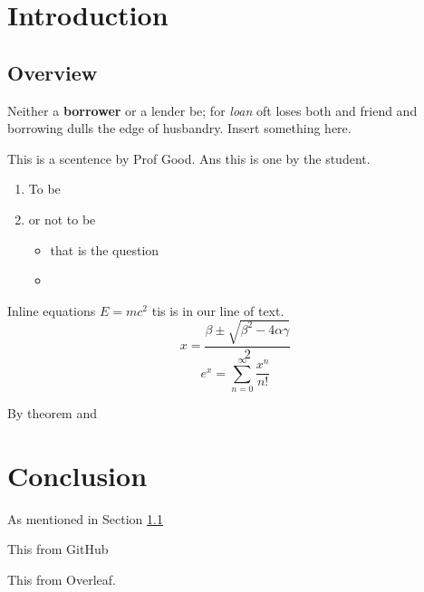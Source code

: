 \chapter{Introduction}

\section{Overview}
\label{Sec:Overview}

Neither a \textbf{borrower} or a lender be; for \textit{loan} oft loses both  and friend and borrowing dulls the edge of husbandry. Insert something here.

This is a scentence by Prof Good. Ans this is one by the student.

\begin{enumerate}
\item To be
\item or not to be
\begin{itemize}
\item that is the question
\item 
\end{itemize}
\end{enumerate}

Inline equations $E=mc^2$ tis is in our line of text.
\[
x = \frac{\beta\pm\sqrt{\beta^2-4\alpha\gamma}}{2}
\]
\[
e^x = \sum_{n=0}^\infty \frac{x^n}{n!}
\]

By theorem \cite{Bunce2003ThePreduals} and \cite[Section 3]{Edwards2003TheSpace}

\chapter{Conclusion}

As mentioned in Section \ref{Sec:Overview} 

This from GitHub

This from Overleaf.

